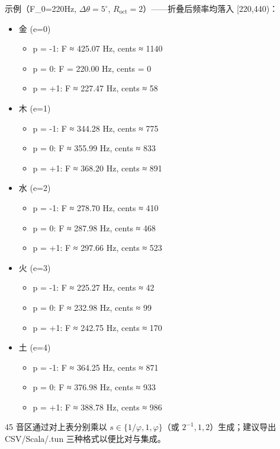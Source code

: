 \documentclass{article}
\begin{document}
示例（F\_0=220Hz, $\Delta\theta=5^\circ$, $R_{\mathrm{oct}}=2$）——折叠后频率均落入 [220,440)：
\begin{itemize}
  \item 金 (e=0)
    \begin{itemize}
      \item p = -1: F ≈ 425.07 Hz, cents ≈ 1140
      \item p =  0: F = 220.00 Hz, cents = 0
      \item p = +1: F ≈ 227.47 Hz, cents ≈ 58
    \end{itemize}
  \item 木 (e=1)
    \begin{itemize}
      \item p = -1: F ≈ 344.28 Hz, cents ≈ 775
      \item p =  0: F ≈ 355.99 Hz, cents ≈ 833
      \item p = +1: F ≈ 368.20 Hz, cents ≈ 891
    \end{itemize}
  \item 水 (e=2)
    \begin{itemize}
      \item p = -1: F ≈ 278.70 Hz, cents ≈ 410
      \item p =  0: F ≈ 287.98 Hz, cents ≈ 468
      \item p = +1: F ≈ 297.66 Hz, cents ≈ 523
    \end{itemize}
  \item 火 (e=3)
    \begin{itemize}
      \item p = -1: F ≈ 225.27 Hz, cents ≈ 42
      \item p =  0: F ≈ 232.98 Hz, cents ≈ 99
      \item p = +1: F ≈ 242.75 Hz, cents ≈ 170
    \end{itemize}
  \item 土 (e=4)
    \begin{itemize}
      \item p = -1: F ≈ 364.25 Hz, cents ≈ 871
      \item p =  0: F ≈ 376.98 Hz, cents ≈ 933
      \item p = +1: F ≈ 388.78 Hz, cents ≈ 986
    \end{itemize}
\end{itemize}

45 音区通过对上表分别乘以 $s\in\{1/\varphi,1,\varphi\}$（或 $2^{-1},1,2$）生成；建议导出 CSV/Scala/.tun 三种格式以便比对与集成。
\end{document}

